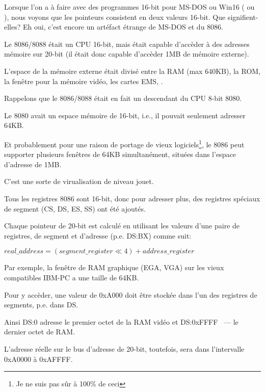 \label{8086_memory_model}

Lorsque l'on a à faire avec des programmes 16-bit pour MS-DOS ou Win16
( ou ),
nous voyons que les pointeurs consistent en deux valeurs 16-bit.
Que signifient-elles? Eh oui, c'est encore un artéfact étrange de MS-DOS et du 8086.

Le 8086/8088 était un CPU 16-bit, mais était capable d'accèder à des adresses mémoire
sur 20-bit (il était donc capable d'accèder 1MB de mémoire externe).

L'espace de la mémoire externe était divisé entre la \ac{RAM} (max 640KB), la \ac{ROM},
la fenêtre pour la mémoire vidéo, les cartes EMS, \etc{}.

Rappelons que le 8086/8088 était en fait un descendant du CPU 8-bit 8080.

Le 8080 avait un espace mémoire de 16-bit, i.e., il pouvait seulement adresser 64KB.

Et probablement pour une raison de portage de vieux logiciels\footnote{Je ne suis
pas sûr à 100\% de ceci}, le 8086 peut supporter plusieurs fenêtres de 64KB simultanément,
situées dans l'espace d'adresse de 1MB.

C'est une sorte de virualisation de niveau jouet.

Tous les registres 8086 sont 16-bit, donc pour adresser plus, des registres spéciaux
de segment (CS, DS, ES, SS) ont été ajoutés.

Chaque pointeur de 20-bit est calculé en utilisant les valeurs d'une paire de registres,
de segment et d'adresse (p.e. DS:BX) comme suit:

\begin{center}
$real\_address = (segment\_register \ll 4) + address\_register$
\end{center}

Par exemple, la fenêtre de \ac{RAM} graphique (\ac{EGA}, \ac{VGA}) sur les vieux
compatibles IBM-PC a une taille de 64KB.

Pour y accèder, une valeur de 0xA000 doit être stockée dans l'un des registres de
segments, p.e. dans DS.

Ainsi DS:0 adresse le premier octet de la \ac{RAM} vidéo et DS:0xFFFF ~--- le dernier
octet de RAM.

L'adresse réelle sur le bus d'adresse de 20-bit, toutefois, sera dans l'intervalle
0xA0000 à 0xAFFFF.

